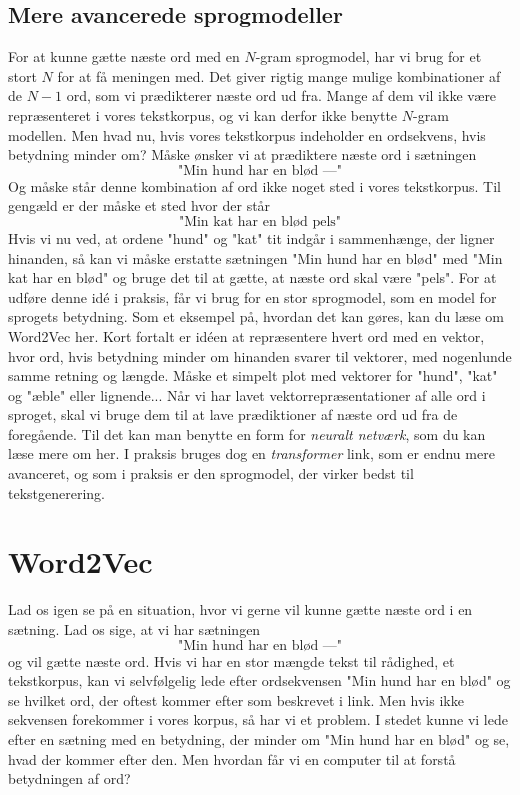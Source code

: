 \documentclass{article}
\newcommand{\am}[1]{{\color{red} #1}}
\begin{document}
\subsection*{Mere avancerede sprogmodeller}
For at kunne gætte næste ord med en $N$-gram sprogmodel, har vi brug for et stort $N$ for at få meningen med. Det giver rigtig mange mulige kombinationer af de $N-1$ ord, som vi prædikterer næste ord ud fra. Mange af dem vil ikke være repræsenteret i vores tekstkorpus, og vi kan derfor ikke benytte $N$-gram modellen. Men hvad nu, hvis vores tekstkorpus indeholder en ordsekvens, hvis betydning minder om? Måske ønsker vi at prædiktere næste ord i sætningen
$$\text{"Min hund har en blød ---"}$$
Og måske står denne kombination af ord ikke noget sted i vores tekstkorpus. Til gengæld er der måske et sted hvor der står
$$\text{"Min kat har en blød pels"}$$
Hvis vi nu ved, at ordene "hund" og "kat" tit indgår i sammenhænge, der ligner hinanden, så kan vi måske erstatte sætningen "Min hund har en blød" med "Min kat har en blød" og bruge det til at gætte, at næste ord skal være "pels". For at udføre denne idé i praksis, får vi brug for en stor sprogmodel, som en model for sprogets betydning. Som et eksempel på, hvordan det kan gøres, kan du læse om Word2Vec \am{her}. Kort fortalt er idéen at repræsentere hvert ord med en vektor, hvor ord, hvis betydning minder om hinanden svarer til vektorer, med nogenlunde samme retning og længde.
\am{Måske et simpelt plot med vektorer for "hund", "kat" og "æble" eller lignende...}
Når vi har lavet vektorrepræsentationer af alle ord i sproget, skal vi bruge dem til at lave prædiktioner af næste ord ud fra de foregående. Til det kan man benytte en form for \emph{neuralt netværk}, som du kan læse mere om \am{her}. I praksis bruges dog en \emph{transformer}\am{link}, som er endnu mere avanceret, og som i praksis er den sprogmodel, der virker bedst til tekstgenerering. 


\section{Word2Vec}
 Lad os igen se på en situation, hvor vi gerne vil kunne gætte næste ord i en sætning. Lad os sige, at vi har sætningen
$$\text{"Min hund har en blød ---"}$$
og vil gætte næste ord. Hvis vi har en stor mængde tekst til rådighed, et tekstkorpus, kan vi selvfølgelig lede efter ordsekvensen "Min hund har en blød" og se hvilket ord, der oftest kommer efter som beskrevet i \am{link}. Men hvis ikke sekvensen forekommer i vores korpus, så har vi et problem. I stedet kunne vi lede efter en sætning med en betydning, der minder om "Min hund har en blød" og se, hvad der kommer efter den. Men hvordan får vi en computer til at forstå betydningen af ord?
\end{document}
